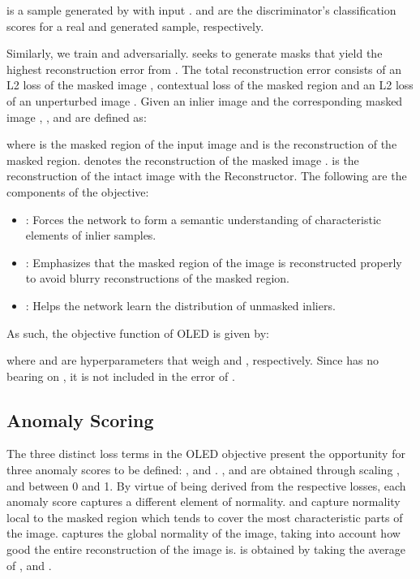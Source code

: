 \documentclass[10pt,twocolumn,letterpaper]{article}
\begin{document}
 is a sample generated by  with input .  and  are the discriminator's classification scores for a real and generated sample, respectively.

Similarly, we train  and  adversarially.  seeks to generate masks that yield the highest reconstruction error from . The total reconstruction error  consists of an L2 loss of the masked image , contextual loss of the masked region  and an L2 loss of an unperturbed image . Given an inlier image  and the corresponding masked image , ,  and  are defined as: 






where  is the masked region of the input image and  is the reconstruction of the masked region.  denotes the reconstruction of the masked image .  is the reconstruction of the intact image  with the Reconstructor. The following are the components of the objective:
\begin{itemize}
    \item : Forces the network to form a semantic understanding of characteristic elements of inlier samples.
    \item : Emphasizes that the masked region of the image is        reconstructed properly to avoid blurry reconstructions of the masked region.
    \item : Helps the network learn the distribution of unmasked inliers. 
\end{itemize}

As such, the objective function of OLED is given by: 


where  and  are hyperparameters that weigh  and , respectively. Since  has no bearing on , it is not included in the error of .

\subsection{Anomaly Scoring}
 The three distinct loss terms in the OLED objective present the opportunity for three anomaly scores to be defined: ,  and . ,  and  are obtained through scaling ,  and  between 0 and 1. By virtue of being derived from the respective losses, each anomaly score captures a different element of normality.  and  capture normality local to the masked region which tends to cover the most characteristic parts of the image.  captures the global normality of the image, taking into account how good the entire reconstruction of the image is.  is obtained by taking the average of ,  and . 
\end{document}
